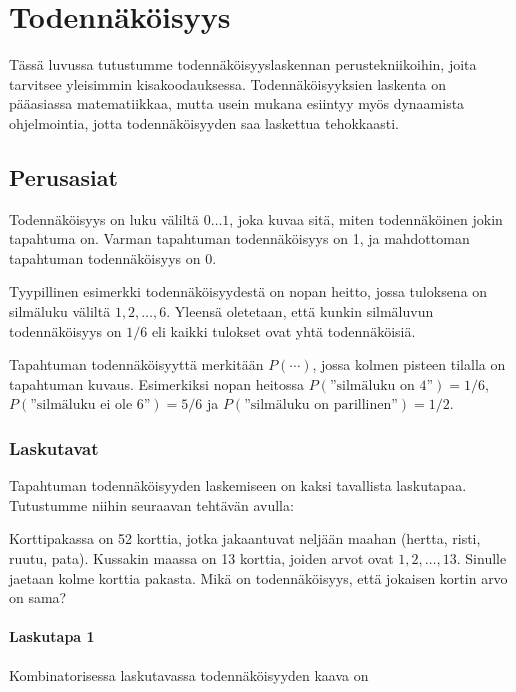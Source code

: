 \chapter{Todennäköisyys}

Tässä luvussa tutustumme todennäköisyyslaskennan
perustekniikoihin, joita tarvitsee yleisimmin
kisakoodauksessa.
Todennäköisyyksien laskenta on pääasiassa
matematiikkaa, mutta usein mukana esiintyy
myös dynaamista ohjelmointia,
jotta todennäköisyyden saa laskettua tehokkaasti.

\section{Perusasiat}

Todennäköisyys on luku väliltä $0 \ldots 1$,
joka kuvaa sitä, miten todennäköinen jokin
tapahtuma on.
Varman tapahtuman todennäköisyys on 1,
ja mahdottoman tapahtuman todennäköisyys on 0.

Tyypillinen esimerkki todennäköisyydestä
on nopan heitto, jossa tuloksena
on silmäluku väliltä $1,2,\ldots,6$.
Yleensä oletetaan, että kunkin silmäluvun
todennäköisyys on $1/6$
eli kaikki tulokset ovat yhtä todennäköisiä.

Tapahtuman todennäköisyyttä merkitään $P(\cdots)$,
jossa kolmen pisteen tilalla on tapahtuman kuvaus.
Esimerkiksi nopan heitossa
$P(\textrm{''silmäluku on 4''})=1/6$,
$P(\textrm{''silmäluku ei ole 6''})=5/6$
ja $P(\textrm{''silmäluku on parillinen''})=1/2$.

\subsection{Laskutavat}

Tapahtuman todennäköisyyden laskemiseen on
kaksi tavallista laskutapaa. Tutustumme niihin
seuraavan tehtävän avulla:

\begin{task}
Korttipakassa on 52 korttia, jotka jakaantuvat
neljään maahan (hertta, risti, ruutu, pata).
Kussakin maassa on 13 korttia, joiden arvot ovat $1,2,\ldots,13$.
Sinulle jaetaan kolme korttia pakasta.
Mikä on todennäköisyys, että jokaisen kortin arvo on sama?
\end{task}

\subsubsection*{Laskutapa 1}

Kombinatorisessa laskutavassa
todennäköisyyden kaava on

